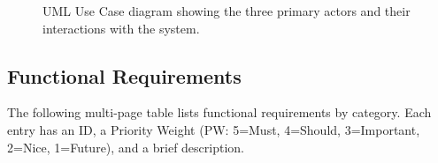 \documentclass[12pt,a4paper]{report}
\renewcommand\_{\textunderscore\hspace{0pt}}
\begin{document}
\begin{figure}[H]
\caption{UML Use Case diagram showing the three primary actors and their interactions with the system.}
\label{fig:use-cases}
\end{figure}

\subsection{Functional Requirements}

The following multi-page table lists functional requirements by category. Each entry has an ID, a Priority Weight (PW: 5=Must, 4=Should, 3=Important, 2=Nice, 1=Future), and a brief description.
\end{document}
